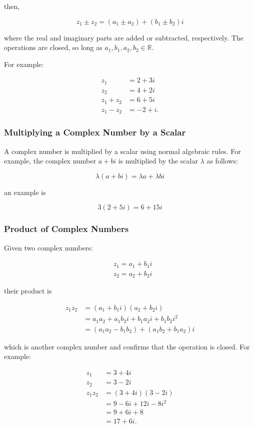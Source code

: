 \documentclass[10pt]{article}
\begin{document}
then,

$$
z_{1} \pm z_{2}=\left(a_{1} \pm a_{2}\right)+\left(b_{1} \pm b_{2}\right) i
$$

where the real and imaginary parts are added or subtracted, respectively. The operations are closed, so long as $a_{1}, b_{1}, a_{2}, b_{2} \in \mathbb{R}$.

For example:

$$
\begin{aligned}
z_{1} & =2+3 i \\
z_{2} & =4+2 i \\
z_{1}+z_{2} & =6+5 i \\
z_{1}-z_{2} & =-2+i .
\end{aligned}
$$

\subsubsection{Multiplying a Complex Number by a Scalar}
A complex number is multiplied by a scalar using normal algebraic rules. For example, the complex number $a+b i$ is multiplied by the scalar $\lambda$ as follows:

$$
\lambda(a+b i)=\lambda a+\lambda b i
$$

an example is

$$
3(2+5 i)=6+15 i
$$

\subsubsection{Product of Complex Numbers}
Given two complex numbers:

$$
\begin{aligned}
& z_{1}=a_{1}+b_{1} i \\
& z_{2}=a_{2}+b_{2} i
\end{aligned}
$$

their product is

$$
\begin{aligned}
z_{1} z_{2} & =\left(a_{1}+b_{1} i\right)\left(a_{2}+b_{2} i\right) \\
& =a_{1} a_{2}+a_{1} b_{2} i+b_{1} a_{2} i+b_{1} b_{2} i^{2} \\
& =\left(a_{1} a_{2}-b_{1} b_{2}\right)+\left(a_{1} b_{2}+b_{1} a_{2}\right) i
\end{aligned}
$$

which is another complex number and confirms that the operation is closed. For example:

$$
\begin{aligned}
z_{1} & =3+4 i \\
z_{2} & =3-2 i \\
z_{1} z_{2} & =(3+4 i)(3-2 i) \\
& =9-6 i+12 i-8 i^{2} \\
& =9+6 i+8 \\
& =17+6 i .
\end{aligned}
$$
\end{document}
